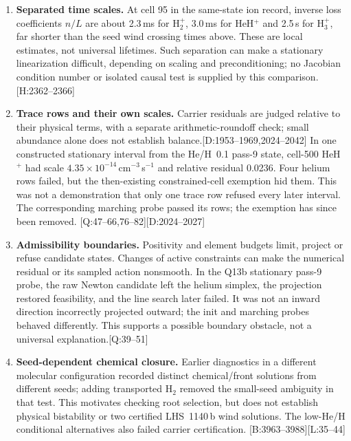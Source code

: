 \documentclass[english,a4paper]{my_memo}
\newcommand{\ev}[2]{\textnormal{\small[#1:#2]}}
\begin{document}
\begin{enumerate}
\item \textbf{Separated time scales.} At cell 95 in the same-state ion
record, inverse loss coefficients $n/L$ are about 2.3\,ms for H$_2^+$,
3.0\,ms for HeH$^+$ and 2.5\,s for H$_3^+$, far shorter than the seed wind
crossing times above. These are local estimates, not universal lifetimes.
Such separation can make a stationary linearization difficult, depending on
scaling and preconditioning; no Jacobian condition number or isolated causal
test is supplied by this comparison.\ev{H}{2362--2366}

\item \textbf{Trace rows and their own scales.} Carrier residuals are judged
relative to their physical terms, with a separate arithmetic-roundoff check;
small abundance alone does not establish balance.\ev{D}{1953--1969,2024--2042}
In one constructed stationary interval from the He/H~0.1 pass-9 state,
cell-500 HeH$^+$ had scale $4.35\times10^{-14}$\,cm$^{-3}$\,s$^{-1}$ and
relative residual 0.0236. Four helium rows failed, but the then-existing
constrained-cell exemption hid them. This was not a demonstration that only
one trace row refused every later interval. The corresponding marching
probe passed its rows; the exemption has since been removed.
\ev{Q}{47--66,76--82}\ev{D}{2024--2027}

\item \textbf{Admissibility boundaries.} Positivity and element budgets
limit, project or refuse candidate states. Changes of active constraints can
make the numerical residual or its sampled action nonsmooth. In the Q13b
stationary pass-9 probe, the raw Newton candidate left the helium simplex,
the projection restored feasibility, and the line search later failed.
It was not an inward direction incorrectly projected outward; the init and
marching probes behaved differently. This supports a possible boundary
obstacle, not a universal explanation.\ev{Q}{39--51}

\item \textbf{Seed-dependent chemical closure.} Earlier diagnostics in a
different molecular configuration recorded distinct chemical/front solutions
from different seeds; adding transported H$_2$ removed the small-seed
ambiguity in that test. This motivates checking root selection, but does not
establish physical bistability or two certified LHS~1140\,b wind solutions.
The low-He/H conditional alternatives also failed carrier certification.
\ev{B}{3963--3988}\ev{L}{35--44}


\end{enumerate}
\end{document}
